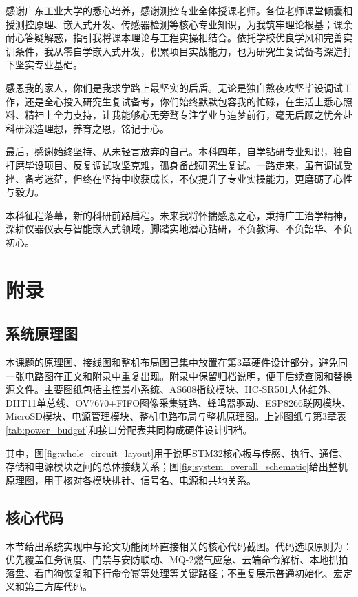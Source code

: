 \documentclass[UTF8,12pt,a4paper,oneside]{ctexbook}
\numberwithin{equation}{chapter}
\begin{document}
感谢广东工业大学的悉心培养，感谢测控专业全体授课老师。各位老师课堂倾囊相授测控原理、嵌入式开发、传感器检测等核心专业知识，为我筑牢理论根基；课余耐心答疑解惑，指引我将课本理论与工程实操相结合。依托学校优良学风和完善实训条件，我从零自学嵌入式开发，积累项目实战能力，也为研究生复试备考深造打下坚实专业基础。

感恩我的家人，你们是我求学路上最坚实的后盾。无论是独自熬夜攻坚毕设调试工作，还是全心投入研究生复试备考，你们始终默默包容我的忙碌，在生活上悉心照料、精神上全力支持，让我能够心无旁骛专注学业与追梦前行，毫无后顾之忧奔赴科研深造理想，养育之恩，铭记于心。

最后，感谢始终坚持、从未轻言放弃的自己。本科四年，自学钻研专业知识，独自打磨毕设项目、反复调试攻坚克难，孤身备战研究生复试。一路走来，虽有调试受挫、备考迷茫，但终在坚持中收获成长，不仅提升了专业实操能力，更磨砺了心性与毅力。

本科征程落幕，新的科研前路启程。未来我将怀揣感恩之心，秉持广工治学精神，深耕仪器仪表与智能嵌入式领域，脚踏实地潜心钻研，不负教诲、不负韶华、不负初心。

\appendix
\chapter{附录}
\section{系统原理图}
本课题的原理图、接线图和整机布局图已集中放置在第3章硬件设计部分，避免同一张电路图在正文和附录中重复出现。附录中保留归档说明，便于后续查阅和替换源文件。主要图纸包括主控最小系统、AS608指纹模块、HC-SR501人体红外、DHT11单总线、OV7670+FIFO图像采集链路、蜂鸣器驱动、ESP8266联网模块、MicroSD模块、电源管理模块、整机电路布局与整机原理图。上述图纸与第3章表\ref{tab:power_budget}和接口分配表共同构成硬件设计归档。

其中，图\ref{fig:whole_circuit_layout}用于说明STM32核心板与传感、执行、通信、存储和电源模块之间的总体接线关系；图\ref{fig:system_overall_schematic}给出整机原理图，用于核对各模块排针、信号名、电源和共地关系。

\section{核心代码}
本节给出系统实现中与论文功能闭环直接相关的核心代码截图。代码选取原则为：优先覆盖任务调度、门禁与安防联动、MQ-2燃气应急、云端命令解析、本地抓拍落盘、看门狗恢复和下行命令幂等处理等关键路径；不重复展示普通初始化、宏定义和第三方库代码。
\end{document}
